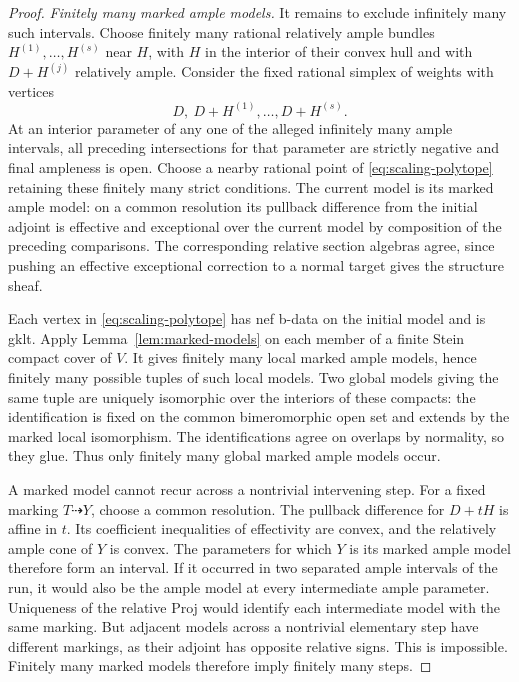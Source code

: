 \begin{proof}
\smallskip
\noindent\emph{Finitely many marked ample models.}
It remains to exclude infinitely many such intervals.  Choose finitely
many rational relatively ample bundles $H^{(1)},\ldots,H^{(s)}$
near $H$, with $H$ in the interior of their convex hull and with
$D+H^{(j)}$ relatively ample.  Consider the fixed rational simplex
of weights with vertices
\begin{equation}\label{eq:scaling-polytope}
 D,\ D+H^{(1)},\ldots,D+H^{(s)}.
\end{equation}
At an interior parameter of any one of the alleged infinitely many
ample intervals, all preceding intersections for that parameter are
strictly negative and final ampleness is open.  Choose a nearby
rational point of \eqref{eq:scaling-polytope} retaining these finitely
many strict conditions.  The current model is its marked ample
model: on a common resolution its pullback difference from the
initial adjoint is effective and exceptional over the current model
by composition of the preceding comparisons.  The corresponding
relative section algebras agree, since pushing an effective
exceptional correction to a normal target gives the structure sheaf.

Each vertex in \eqref{eq:scaling-polytope} has nef b-data on the
initial model and is gklt.  Apply Lemma~\ref{lem:marked-models} on
each member of a finite Stein compact cover of $V$.  It gives finitely
many local marked ample models, hence finitely many possible tuples
of such local models.  Two global models giving the same tuple are
uniquely isomorphic over the interiors of these compacts: the
identification is fixed on the common bimeromorphic open set and
extends by the marked local isomorphism.  The identifications agree
on overlaps by normality, so they glue.  Thus only finitely many
global marked ample models occur.

A marked model cannot recur across a nontrivial intervening step.
For a fixed marking $T\dashrightarrow Y$, choose a common resolution.
The pullback difference for $D+tH$ is affine in $t$.  Its coefficient
inequalities of effectivity are convex, and the relatively ample cone
of $Y$ is convex.  The parameters for which $Y$ is its marked ample
model therefore form an interval.  If it occurred in two separated
ample intervals of the run, it would also be the ample model at every
intermediate ample parameter.  Uniqueness of the relative Proj would
identify each intermediate model with the same marking.  But adjacent
models across a nontrivial elementary step have different markings,
as their adjoint has opposite relative signs.  This is impossible.
Finitely many marked models therefore imply finitely many steps.
\end{proof}

